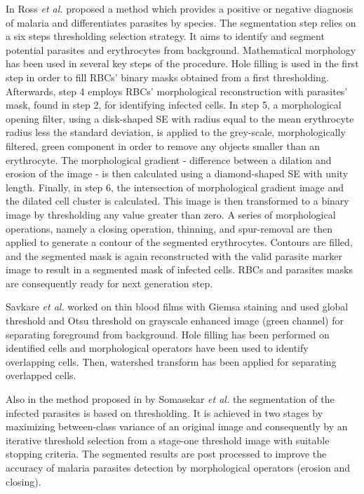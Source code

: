 \documentclass[sensors,review,submit,moreauthors,pdftex,10pt,a4paper]{mdpi}
\begin{document}
In \cite{Ross2006} Ross \emph{et al.} proposed a method which provides a positive or negative diagnosis of malaria and differentiates parasites by species. The segmentation step relies on a six steps thresholding selection strategy. It aims to identify and segment potential parasites and erythrocytes from background. Mathematical morphology has been used in several key steps of the procedure. Hole filling is used in the first step in order to fill RBCs' binary masks obtained from a first thresholding. Afterwards, step 4 employs RBCs' morphological reconstruction with parasites' mask, found in step 2, for identifying infected cells. In step 5, a morphological opening filter, using a disk-shaped SE with radius equal to the mean erythrocyte radius less the standard deviation, is applied to the grey-scale, morphologically filtered, green component in order to remove any objects smaller than an erythrocyte. The morphological gradient - difference between a dilation and erosion of the image - is then calculated using a diamond-shaped SE with unity length.
Finally, in step 6, the intersection of morphological gradient image and the dilated cell cluster is calculated. This image is then transformed to a binary image by thresholding any value greater than zero. A series of morphological operations, namely a closing operation, thinning, and spur-removal are then applied to generate a contour of the segmented erythrocytes. Contours are filled, and the segmented mask is again reconstructed with the valid parasite marker image to result in a segmented mask of infected cells. RBCs and parasites masks are consequently ready for next generation step.

Savkare \emph{et al.} \cite{Savkare2011b} worked on thin blood films with Giemsa staining and used global threshold and Otsu threshold \cite{Otsu1975} on grayscale enhanced image (green channel) for separating foreground from background. Hole filling has been performed on identified cells and morphological operators have been used to identify overlapping cells. Then, watershed transform has been applied for separating overlapped cells.

Also in the method proposed in \cite{Somasekar2017} by Somasekar \emph{et al.} the segmentation of the infected parasites is based on thresholding. It is achieved in two stages by maximizing between-class variance of an original image and consequently by an iterative threshold selection from a stage-one threshold image with suitable stopping criteria. The segmented results are post processed to improve the accuracy of malaria parasites detection by morphological operators (erosion and closing).
\end{document}
